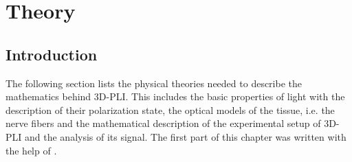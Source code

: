 \setcounter{chapter}{2}
\chapter{Theory}
\label{sec:theory}
% 
%
\section{Introduction}
The following section lists the physical theories needed to describe the mathematics behind \ac{3D-PLI}. This includes the basic properties of light with the description of their polarization state, the optical models of the tissue, i.e. the nerve fibers and the mathematical description of the experimental setup of \ac{3D-PLI} and the analysis of its signal. The first part of this chapter was written with the help of \cite{demtroeder2, Fliebach2012}.
% 
% 
% 

